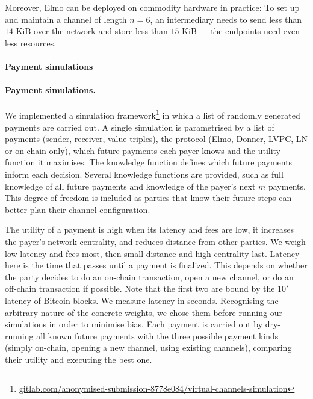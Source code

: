   Moreover, Elmo can be deployed on commodity hardware in practice: To set up
  and maintain a channel of length $n=6$, an intermediary needs to send less
  than $14$ KiB over the network and store less than $15$ KiB --- the endpoints
  need even less resources.

  \makeatletter%
    {\paragraph{Payment simulations}}%
    {\paragraph{Payment simulations.}}%
  \makeatother%
  We implemented a simulation
  framework\footnote{\url{gitlab.com/anonymised-submission-8778e084/virtual-channels-simulation}}
  in which a list of randomly generated payments are carried out.
  A single simulation is parametrised by a list of payments
  (sender, receiver, value triples), the protocol (Elmo, Donner, LVPC, LN or
  on-chain only), which future payments each payer knows and the utility
  function it maximises. The knowledge function defines which future payments
  inform each decision.
  Several knowledge functions are provided, such as full
  knowledge of all future payments and knowledge of the payer's next $m$
  payments. This degree of freedom is included as parties that know their future
  steps can better plan their channel configuration.

  The utility of a payment is high when its latency and fees are
  low, it increases the payer's network centrality, and reduces
  distance from other parties. We weigh low latency
  and fees most, then small distance and high centrality last.
  Latency here is the time that passes until a payment is finalized. This depends on whether the party decides to do an on-chain transaction, open a new channel, or do an off-chain transaction if possible. Note that the first two are bound by the \raisebox{0.5ex}{\texttildelow}$10'$ latency of Bitcoin blocks. We measure latency in seconds.
  Recognising the arbitrary nature of the concrete weights, we
  chose them before running our simulations in order to minimise
  bias.
  Each payment is carried out by dry-running all known future
  payments with the three possible payment kinds (simply
  on-chain, opening a new channel, using existing
  channels), comparing their utility and executing the best one.

